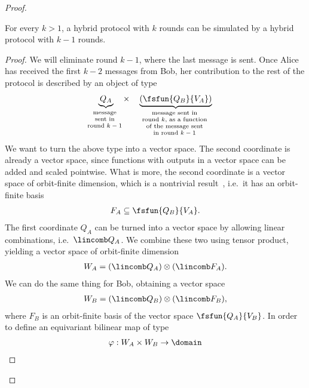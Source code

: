 \begin{proof}
    \begin{claim}\label{claim:reduce-round}
        For every $k > 1$, a hybrid protocol with $k$ rounds can be simulated by a hybrid protocol with $k-1$ rounds.
    \end{claim}
    \begin{proof}
        We will eliminate round $k-1$, where the last message is sent. Once Alice has received the first $k-2$ messages from Bob, her contribution to the rest of the protocol is described by an object of type 
          \begin{align}\label{eq:contribution-last-two-rounds}
            \myunderbrace{Q_A}{message \\ sent in \\ round $k-1$} \quad \times \quad  \myunderbrace{(\fsfun  {Q_B} {V_A})}{message sent in \\ round $k$, as a function \\ of the message sent \\ in  round $k-1$}
        \end{align}
        We want to turn the above type into a vector space. The second coordinate is already a vector space, since functions with outputs in a vector space can be added and scaled pointwise. What is more, the  second coordinate  is  a vector space of orbit-finite dimension, which is a nontrivial result~\cite[Section 8.3]{bojanczyk_slightly}, i.e.~it has an orbit-finite basis  
        \begin{align*}
        F_A \subseteq \fsfun  {Q_B} {V_A}.  
        \end{align*}
        The first coordinate $Q_A$ can be turned into a vector space by  allowing linear combinations, i.e.~$\lincomb Q_A$. We combine these two using tensor product, yielding a vector space of orbit-finite dimension
        \begin{align*}
           W_A =  (\lincomb Q_A) \otimes (\lincomb F_A).
        \end{align*}
        We can do the same thing for Bob, obtaining a vector space
        \begin{align*}
           W_B =  (\lincomb Q_B) \otimes (\lincomb F_B),
        \end{align*}
        where $F_B$ is an orbit-finite basis of the vector space $\fsfun  {Q_A} {V_B}$.
        In order to define an equivariant bilinear map of type
        \begin{align*}
        \varphi : W_A \times W_B \to \domain
        \end{align*}

\end{proof}
\end{proof}
